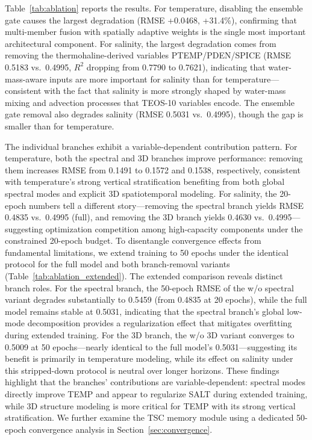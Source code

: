 \documentclass[conference]{IEEEtran}
\begin{document}
Table~\ref{tab:ablation} reports the results. For temperature, disabling the ensemble gate causes the largest degradation (RMSE +0.0468, +31.4\%), confirming that multi-member fusion with spatially adaptive weights is the single most important architectural component. For salinity, the largest degradation comes from removing the thermohaline-derived variables PTEMP/PDEN/SPICE (RMSE 0.5183 vs.\ 0.4995, $R^2$ dropping from 0.7790 to 0.7621), indicating that water-mass-aware inputs are more important for salinity than for temperature---consistent with the fact that salinity is more strongly shaped by water-mass mixing and advection processes that TEOS-10 variables encode. The ensemble gate removal also degrades salinity (RMSE 0.5031 vs.\ 0.4995), though the gap is smaller than for temperature.

The individual branches exhibit a variable-dependent contribution pattern. For temperature, both the spectral and 3D branches improve performance: removing them increases RMSE from 0.1491 to 0.1572 and 0.1538, respectively, consistent with temperature's strong vertical stratification benefiting from both global spectral modes and explicit 3D spatiotemporal modeling. For salinity, the 20-epoch numbers tell a different story---removing the spectral branch yields RMSE 0.4835 vs.\ 0.4995 (full), and removing the 3D branch yields 0.4630 vs.\ 0.4995---suggesting optimization competition among high-capacity components under the constrained 20-epoch budget. To disentangle convergence effects from fundamental limitations, we extend training to 50 epochs under the identical protocol for the full model and both branch-removal variants (Table~\ref{tab:ablation_extended}). The extended comparison reveals distinct branch roles. For the spectral branch, the 50-epoch RMSE of the w/o spectral variant degrades substantially to 0.5459 (from 0.4835 at 20 epochs), while the full model remains stable at 0.5031, indicating that the spectral branch's global low-mode decomposition provides a regularization effect that mitigates overfitting during extended training. For the 3D branch, the w/o 3D variant converges to 0.5009 at 50 epochs---nearly identical to the full model's 0.5031---suggesting its benefit is primarily in temperature modeling, while its effect on salinity under this stripped-down protocol is neutral over longer horizons. These findings highlight that the branches' contributions are variable-dependent: spectral modes directly improve TEMP and appear to regularize SALT during extended training, while 3D structure modeling is more critical for TEMP with its strong vertical stratification. We further examine the TSC memory module using a dedicated 50-epoch convergence analysis in Section~\ref{sec:convergence}.
\end{document}
